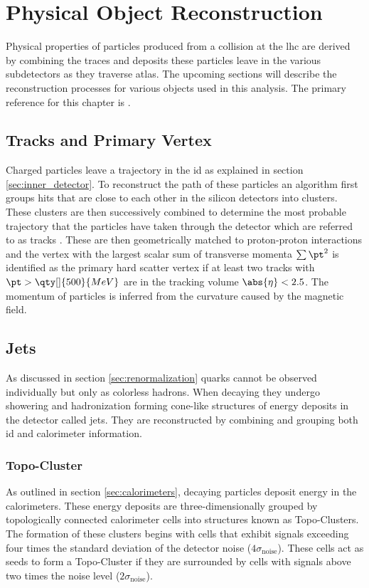 \chapter{Physical Object Reconstruction}\label{ch:reco}

Physical properties of particles produced from a collision at the \ac{lhc} are derived by combining the traces and deposits these particles leave in the various subdetectors as they traverse \ac{atlas}. The upcoming sections will describe the reconstruction processes for various objects used in this analysis. The primary reference for this chapter is \citep{atlas2021optimisation}.

\section{Tracks and Primary Vertex}\label{sec:tracks}
Charged particles leave a trajectory in the \ac{id} as explained in section \ref{sec:inner_detector}. To reconstruct the path of these particles an algorithm first groups hits that are close to each other in the silicon detectors into clusters. These clusters are then successively combined to determine the most probable trajectory that the particles have taken through the detector which are referred to as tracks \citep{aaboud2017performance}. These are then geometrically matched to proton-proton interactions and the vertex with the largest scalar sum of transverse momenta $\sum \pt^2$ is identified as the primary hard scatter vertex if at least two tracks with $\pt>\qty[]{500}{MeV}$ are in the tracking volume $\abs{\eta}<2.5$. The momentum of particles is inferred from the curvature caused by the magnetic field.

\section{Jets}\label{sec:jets}
As discussed in section \ref{sec:renormalization} quarks cannot be observed individually but only as colorless hadrons. When decaying they undergo showering and hadronization forming cone-like structures of energy deposits in the detector called jets. They are reconstructed by combining and grouping both \ac{id} and calorimeter information.

\subsection{Topo-Cluster}
As outlined in section \ref{sec:calorimeters}, decaying particles deposit energy in the calorimeters. These energy deposits are three-dimensionally grouped by topologically connected calorimeter cells into structures known as Topo-Clusters. The formation of these clusters begins with cells that exhibit signals exceeding four times the standard deviation of the detector noise ($4\sigma_\mathrm{noise}$). These cells act as seeds to form a Topo-Cluster if they are surrounded by cells with signals above two times the noise level ($2\sigma_\mathrm{noise}$).

